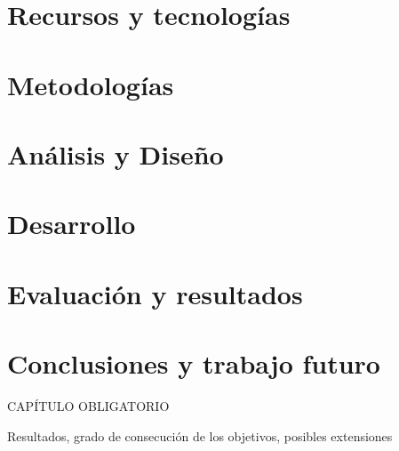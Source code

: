 \documentclass[oneside,12pt]{book}
\begin{document}
\chapter{Recursos y tecnologías}
\newpage
\chapter{Metodologías}
\newpage
\chapter{Análisis y Diseño}
\newpage
\chapter{Desarrollo}
\newpage

\chapter{Evaluación y resultados}


\chapter{Conclusiones y trabajo futuro}
%
CAPÍTULO OBLIGATORIO

Resultados,  grado  de  consecución  de  los  objetivos,  posibles extensiones
\newpage


\end{document}
